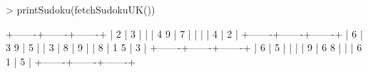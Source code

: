 \begin{Schunk}
\begin{Sinput}
> printSudoku(fetchSudokuUK())
\end{Sinput}
\begin{Soutput}
  +-------+-------+-------+
  |     2 |     3 |       |
  |   4 9 |   7   |       |
  |       |   4   |     2 |
  +-------+-------+-------+
  |   6   | 3   9 |   5   |
  | 3     |   8   |     9 |
  |   8   | 1   5 |   3   |
  +-------+-------+-------+
  | 6     |   5   |       |
  |       |   9   | 6 8   |
  |       | 6   1 | 5     |
  +-------+-------+-------+
\end{Soutput}
\end{Schunk}
